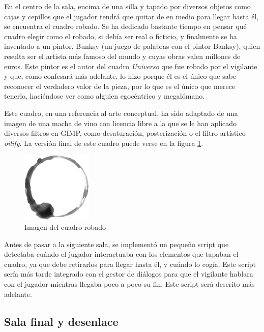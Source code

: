 En el centro de la sala, encima de una silla y tapado por diversos objetos como cajas y cepillos que el jugador tendrá que quitar de en medio para llegar hasta él, se encuentra el cuadro robado. Se ha dedicado bastante tiempo en pensar qué cuadro elegir como el robado, si debía ser real o ficticio, y finalmente se ha inventado a un pintor, Bunksy (un juego de palabras con el pintor Banksy), quien resulta ser el artista más famoso del mundo y cuyas obras valen millones de euros. Este pintor es el autor del cuadro \textit{Universo} que fue robado por el vigilante y que, como confesará más adelante, lo hizo porque él es el único que sabe reconocer el verdadero valor de la pieza, por lo que es el único que merece tenerlo, haciéndose ver como alguien egocéntrico y megalómano.

Este cuadro, en una referencia al arte conceptual, ha sido adaptado de una imagen de una macha de vino con licencia libre a la que se le han aplicado diversos filtros en GIMP, como desaturación, posterización o el filtro artístico \textit{oilify}. La versión final de este cuadro puede verse en la figura \ref{fig:universe}.

\begin{figure}[!h]
\vspace{-0.15cm}
\begin{center}
\includegraphics[width=0.3\textwidth]{imagenes/7/wine-stain.jpg}
\caption{Imagen del cuadro robado}
\label{fig:universe}
\end{center}
\vspace{-0.35cm}
\end{figure}

Antes de pasar a la siguiente sala, se implementó un pequeño script que detectaba cuándo el jugador interactuaba con los elementos que tapaban el cuadro, ya que debe retirarlos para llegar hasta él, y cuándo lo cogía. Este script sería más tarde integrado con el gestor de diálogos para que el vigilante hablara con el jugador mientras llegaba poco a poco su fin. Este script será descrito más adelante.

\subsection{Sala final y desenlace}

